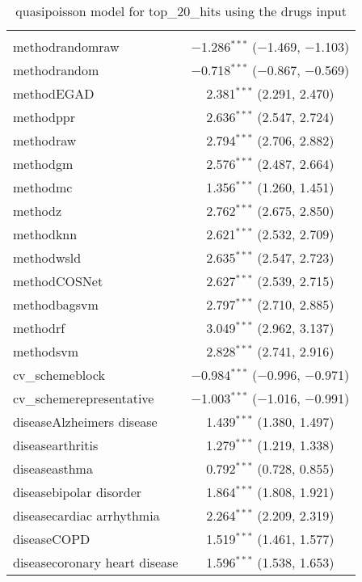 
\begin{table}[!htbp] \centering 
  \caption{quasipoisson model for top_20_hits using the drugs input} 
  \label{} 
\begin{tabular}{@{\extracolsep{5pt}}lc} 
\\[-1.8ex]\hline 
\hline \\[-1.8ex] 
 methodrandomraw & $-$1.286$^{***}$ ($-$1.469, $-$1.103) \\ 
  methodrandom & $-$0.718$^{***}$ ($-$0.867, $-$0.569) \\ 
  methodEGAD & 2.381$^{***}$ (2.291, 2.470) \\ 
  methodppr & 2.636$^{***}$ (2.547, 2.724) \\ 
  methodraw & 2.794$^{***}$ (2.706, 2.882) \\ 
  methodgm & 2.576$^{***}$ (2.487, 2.664) \\ 
  methodmc & 1.356$^{***}$ (1.260, 1.451) \\ 
  methodz & 2.762$^{***}$ (2.675, 2.850) \\ 
  methodknn & 2.621$^{***}$ (2.532, 2.709) \\ 
  methodwsld & 2.635$^{***}$ (2.547, 2.723) \\ 
  methodCOSNet & 2.627$^{***}$ (2.539, 2.715) \\ 
  methodbagsvm & 2.797$^{***}$ (2.710, 2.885) \\ 
  methodrf & 3.049$^{***}$ (2.962, 3.137) \\ 
  methodsvm & 2.828$^{***}$ (2.741, 2.916) \\ 
  cv\_schemeblock & $-$0.984$^{***}$ ($-$0.996, $-$0.971) \\ 
  cv\_schemerepresentative & $-$1.003$^{***}$ ($-$1.016, $-$0.991) \\ 
  diseaseAlzheimers disease & 1.439$^{***}$ (1.380, 1.497) \\ 
  diseasearthritis & 1.279$^{***}$ (1.219, 1.338) \\ 
  diseaseasthma & 0.792$^{***}$ (0.728, 0.855) \\ 
  diseasebipolar disorder & 1.864$^{***}$ (1.808, 1.921) \\ 
  diseasecardiac arrhythmia & 2.264$^{***}$ (2.209, 2.319) \\ 
  diseaseCOPD & 1.519$^{***}$ (1.461, 1.577) \\ 
  diseasecoronary heart disease & 1.596$^{***}$ (1.538, 1.653) \\ 

\end{tabular}
\end{table}
